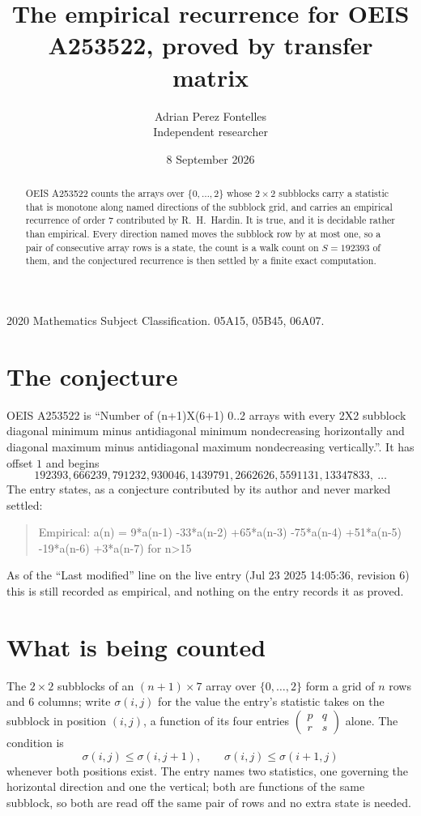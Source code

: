 \documentclass[11pt,a4paper]{article}
\title{The empirical recurrence for OEIS A253522, proved by transfer matrix}
\author{Adrian Perez Fontelles\\ \small Independent researcher}
\date{8 September 2026}
\theoremstyle{plain}
\theoremstyle{definition}
\begin{document}
\maketitle

\begin{abstract}
OEIS A253522 counts the arrays over $\{0,\dots,2\}$ whose $2\times2$ subblocks carry a
statistic that is monotone along named directions of the subblock grid, and carries an
empirical recurrence of order $7$ contributed by R.~H.~Hardin. It is true, and it is
decidable rather than empirical. Every direction named moves the subblock row by at most one,
so a pair of consecutive array rows is a state, the count is a walk count on $S=192393$ of them,
and the conjectured recurrence is then settled by a finite exact computation.
\end{abstract}

\noindent\small 2020 Mathematics Subject Classification. 05A15, 05B45, 06A07.\normalsize

\section{The conjecture}

OEIS A253522 is ``Number of (n+1)X(6+1) 0..2 arrays with every 2X2 subblock diagonal minimum minus antidiagonal minimum nondecreasing horizontally and diagonal maximum minus antidiagonal maximum nondecreasing vertically.''. It has offset $1$ and begins
\[
192393, 666239, 791232, 930046, 1439791, 2662626, 5591131, 13347833,\ \dots
\]
The entry states, as a conjecture contributed by its author and never marked settled:
\begin{quote}
Empirical: a(n) = 9*a(n-1) -33*a(n-2) +65*a(n-3) -75*a(n-4) +51*a(n-5) -19*a(n-6) +3*a(n-7) for n>15
\end{quote}
As of the ``Last modified'' line on the live entry (Jul 23 2025 14:05:36, revision 6) this is still
recorded as empirical, and nothing on the entry records it as proved.

\section{What is being counted}

The $2\times2$ subblocks of an $(n+1)\times7$ array over $\{0,\dots,2\}$ form a grid
of $n$ rows and $6$ columns; write $\sigma(i,j)$ for the value the entry's statistic takes on
the subblock in position $(i,j)$, a function of its four entries
$\begin{pmatrix}p&q\\r&s\end{pmatrix}$ alone. The condition is
\[
\sigma(i,j)\le\sigma(i,j+1),\qquad \sigma(i,j)\le\sigma(i+1,j)
\]
whenever both positions exist. The entry names two statistics, one governing the horizontal direction and one the vertical; both are functions of the same subblock, so both are read off the same pair of rows and no extra state is needed.
\end{document}
